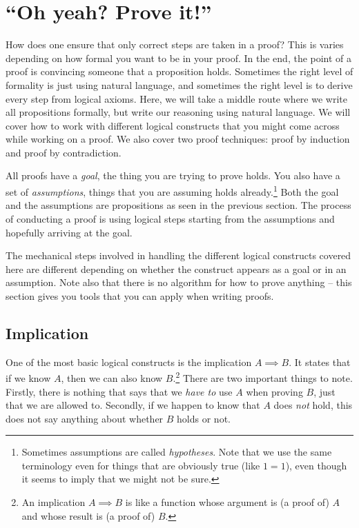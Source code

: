 \documentclass{tufte-handout}
\begin{document}
\section{``Oh yeah? Prove it!''}

How does one ensure that only correct steps are taken in a proof?
This is varies depending on how formal you want to be in your
proof. In the end, the point of a proof is convincing someone that
a proposition holds. Sometimes the right level of formality is
just using natural language, and sometimes the right level is to
derive every step from logical axioms.
%
Here, we will take a middle route where we write all propositions
formally, but write our reasoning using natural language.
%
We will cover how to work with different logical constructs that
you might come across while working on a proof. We also cover two
proof techniques: proof by induction and proof by contradiction.

All proofs have a \emph{goal}, the thing you are trying to prove
holds. You also have a set of \emph{assumptions}, things that you
are assuming holds already.\footnote{Sometimes assumptions are
  called \emph{hypotheses}. Note that we use the same terminology
  even for things that are obviously true (like $1=1$), even
  though it seems to imply that we might not be sure.} Both the
goal and the assumptions are propositions as seen in the previous
section. The process of conducting a proof is using logical steps
starting from the assumptions and hopefully arriving at the goal.

The mechanical steps involved in handling the different logical
constructs covered here are different depending on whether the
construct appears as a goal or in an assumption. Note also that
there is no algorithm for how to prove anything -- this section
gives you tools that you can apply when writing proofs.


\subsection{Implication}

One of the most basic logical constructs is the implication
$A \!\!\implies\!\! B$. It states that if we know $A$, then we can also
know $B$.\footnote{An implication $A \implies B$ is like a function
  whose argument is (a proof of) $A$ and whose result is (a proof
  of) $B$.} There are two important things to note. Firstly,
there is nothing that says that we \emph{have to} use $A$ when
proving $B$, just that we are allowed to. Secondly, if we happen
to know that $A$ does \emph{not} hold, this does not say anything
about whether $B$ holds or not.
\end{document}
